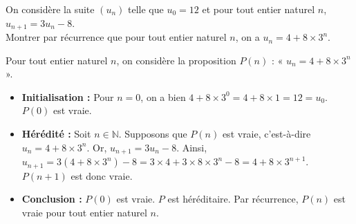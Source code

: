\documentclass[11pt,fleqn]{book} %
\begin{document}
\begin{exercise}[topic=rec01]On considère la suite $(u_n)$ telle que $u_0=12$ et pour tout entier naturel $n$, $u_{n+1}=3u_n-8$.\\ Montrer par récurrence que pour tout entier naturel $n$, on a  $u_n=4+8\times 3^n$.\end{exercise}
\begin{solution}Pour tout entier naturel $n$, on considère la proposition $P(n)$ : « $u_n=4+8\times 3^n$ ».
\begin{itemize}
\item \textbf{Initialisation :} Pour $n=0$, on a bien $4+8\times 3^0=4+8\times 1 = 12 = u_0$. $P(0)$ est vraie.
\item \textbf{Hérédité :} Soit $n\in\mathbb{N}$. Supposons que $P(n)$ est vraie, c'est-à-dire $u_n=4+8\times 3^n$. Or, $u_{n+1}=3u_n-8$. Ainsi, $u_{n+1}=3(4+8\times3^n)-8=3\times 4 +3\times 8 \times 3^n - 8 = 4 + 8 \times 3^{n+1}$. $P(n+1)$ est donc vraie.
\item \textbf{Conclusion :} $P(0)$ est vraie. $P$ est héréditaire. Par récurrence, $P(n)$ est vraie pour tout entier naturel $n$.
\end{itemize}\end{solution}
\end{document}
